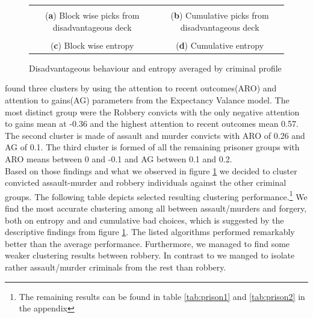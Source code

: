 \documentclass[12pt,a4paper,bibliography=totocnumbered,listof=totocnumbered]{scrartcl}
\begin{document}
{\renewcommand{\arraystretch}{0.4}%
\begin{figure}[H]
	\centering
	\small
	\hspace*{-0.7in}
	\begin{tabular}{cc}
	 &  \\
	(\textbf{a}) Block wise picks from disadvantageous deck & (\textbf{b}) Cumulative picks from disadvantageous deck  \\
	 &  \\
	(\textbf{c}) Block wise entropy  & (\textbf{d}) Cumulative entropy 
	\end{tabular} \quad
	\caption{Disadvantageous behaviour and entropy averaged by criminal profile }
	\label{fig:ent}
\end{figure}

\cite{Yechiam2008} found three clusters by using the attention to recent outcomes(ARO) and attention to gains(AG) parameters from the Expectancy Valance model. The most distinct group were the Robbery convicts with the only negative attention to gains mean at -0.36 and the highest attention to recent outcomes mean 0.57. The second cluster is made of assault and murder convicts with ARO of 0.26 and AG of 0.1. The third cluster is formed of all the remaining prisoner groups with ARO means between 0 and -0.1 and AG between 0.1 and 0.2.\\
Based on those findings and what we observed in figure \ref{fig:ent} we decided to cluster convicted assault-murder and robbery individuals against the other criminal groups. The following table depicts selected resulting clustering performance.\footnote{The remaining results can be found in table  \ref{tab:prison1} and \ref{tab:prison2} in the appendix} We find the most accurate clustering among all between assault/murders and forgery, both on entropy and and cumulative bad choices, which is suggested by the descriptive findings from figure \ref{fig:ent}. The listed algorithms performed remarkably better than the average performance. Furthermore, we managed to find some weaker clustering results between robbery. In contrast to \cite{Yechiam2008} we manged to isolate rather assault/murder criminals from the rest than robbery.

}
\end{document}
